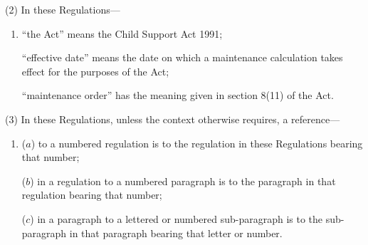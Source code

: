 \documentclass[12pt,a4paper]{article}
\begin{document}
(2) In these Regulations—
\begin{enumerate}\item[]
“the Act” means the Child Support Act 1991;



“effective date” means the date on which a maintenance 
calculation
takes effect for the purposes of the Act;

“maintenance order” has the meaning given in section 8(11) of the Act.
\end{enumerate}

(3) In these Regulations, unless the context otherwise requires, a reference—
\begin{enumerate}\item[]
($a$) to a numbered regulation is to the regulation in these Regulations bearing that number;

($b$) in a regulation to a numbered paragraph is to the paragraph in that regulation bearing that number;

($c$) in a paragraph to a lettered or numbered sub-paragraph is to the sub-paragraph in that paragraph bearing that letter or number.
\end{enumerate}
\end{document}
